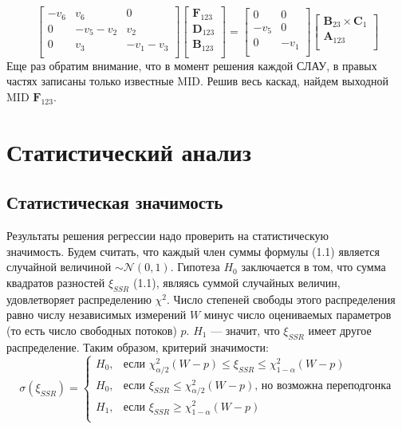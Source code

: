 \documentclass[14pt, a4paper]{extreport}
\begin{document}
$$\begin{bmatrix}
-v_6 & v_6 & 0\\
0 & -v_5-v_2 & v_2\\
0 & v_3 & -v_1-v_3\\
\end{bmatrix}
\begin{bmatrix}
\mathbf{F}_{123}\\
\mathbf{D}_{123}\\
\mathbf{B}_{123}\\
\end{bmatrix}
=
\begin{bmatrix}
0 & 0\\
-v_5 & 0\\
0 & -v_1\\
\end{bmatrix}
\begin{bmatrix}
\mathbf{B}_{23} \times \mathbf{C}_1\\
\mathbf{A}_{123}\\
\end{bmatrix}
$$
Еще раз обратим внимание, что в момент решения каждой СЛАУ, в правых частях записаны только известные MID. Решив весь каскад, найдем выходной MID $\mathbf{F}_{123}$.
\clearpage
\section{Статистический анализ}
\subsection{Статистическая значимость}
Результаты решения регрессии надо проверить на статистическую\\ значимость\cite{shupltesov_review_2}. Будем считать, что каждый член суммы формулы (1.1) является случайной величиной $\sim \mathcal{N}(0, 1)$. Гипотеза $H_0$ заключается в том, что сумма квадратов разностей $\xi_{SSR}$ (1.1), являясь суммой случайных величин, удовлетворяет распределению $\chi^2$. Число степеней свободы этого распределения равно числу независимых измерений $W$ минус число оцениваемых параметров (то есть число свободных потоков) $p$. $H_1$ --- значит, что $\xi_{SSR}$ имеет другое распределение. Таким образом, критерий значимости:
$$
\sigma(\xi_{SSR}) = \begin{cases}
	H_0,&\text{если $\chi^2_{\alpha / 2}(W - p) \le \xi_{SSR} \le \chi^2_{1 - \alpha}(W - p)$}\\
	H_0,&\text{если $\xi_{SSR} \leq \chi^2_{\alpha / 2}(W - p)$, но возможна переподгонка}\\
	H_1,&\text{если $\xi_{SSR} \geq \chi^2_{1 - \alpha}(W - p)$}\\
\end{cases}$$
\end{document}
